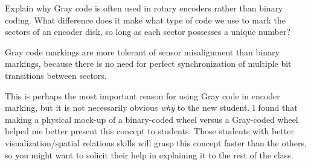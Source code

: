 

Explain why Gray code is often used in rotary encoders rather than binary coding.  What difference does it make what type of code we use to mark the sectors of an encoder disk, so long as each sector possesses a unique number?







Gray code markings are more tolerant of sensor misalignment than binary markings, because there is no need for perfect synchronization of multiple bit transitions between sectors.







This is perhaps the most important reason for using Gray code in encoder marking, but it is not necessarily obvious {\it why} to the new student.  I found that making a physical mock-up of a binary-coded wheel versus a Gray-coded wheel helped me better present this concept to students.  Those students with better visualization/spatial relations skills will grasp this concept faster than the others, so you might want to solicit their help in explaining it to the rest of the class.




